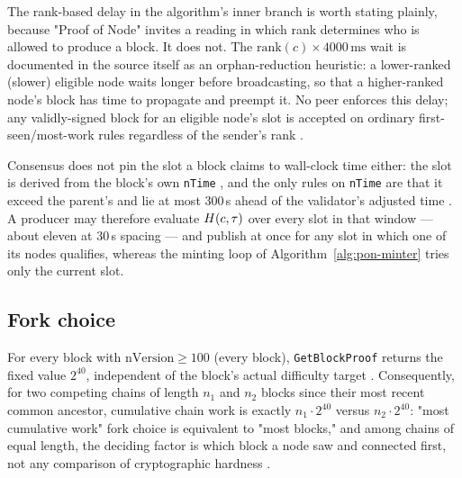The rank-based delay in the algorithm's inner branch is worth stating plainly, because "Proof of Node"
invites a reading in which rank determines who is allowed to produce a block. It does not. The
$\mathrm{rank}(c) \times 4000\,\mathrm{ms}$ wait is documented in the source itself as an
orphan-reduction heuristic: a lower-ranked (slower) eligible node waits longer before broadcasting, so
that a higher-ranked node's block has time to propagate and preempt it. No peer enforces this delay;
any validly-signed block for an eligible node's slot is accepted on ordinary first-seen/most-work
rules regardless of the sender's rank
\shipped {}.

Consensus does not pin the slot a block claims to wall-clock time either: the slot is derived from
the block's own \texttt{nTime} \shipped {}, and
the only rules on \texttt{nTime} are that it exceed the parent's
 and lie at most 300\,s ahead of the validator's
adjusted time . A producer may therefore evaluate
$H(c,\tau)$ over every slot in that window --- about eleven at 30\,s spacing --- and publish at once
for any slot in which one of its nodes qualifies, whereas the minting loop of
Algorithm~\ref{alg:pon-minter} tries only the current slot.

\subsection{Fork choice}
\label{sec:consensus-forkchoice}

\begin{property}
\label{prop:pon-forkchoice}
For every block with $\mathrm{nVersion} \ge 100$ (every \PoN block), \texttt{GetBlockProof} returns the
fixed value $2^{40}$, independent of the block's actual difficulty target
\shipped {}. Consequently, for two competing \PoN chains of length
$n_1$ and $n_2$ blocks since their most recent common ancestor, cumulative chain work is exactly
$n_1 \cdot 2^{40}$ versus $n_2 \cdot 2^{40}$: "most cumulative work" fork choice is equivalent to "most
blocks," and among chains of equal length, the deciding factor is which block a node saw and connected
first, not any comparison of cryptographic hardness
\shipped {}.
\end{property}

